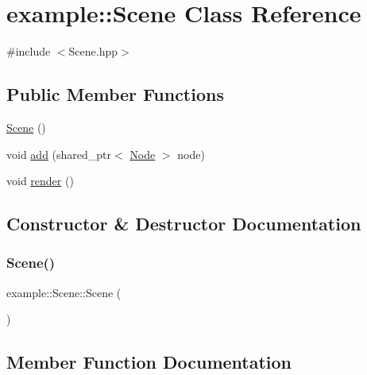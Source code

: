 \hypertarget{classexample_1_1_scene}{}\section{example\+:\+:Scene Class Reference}
\label{classexample_1_1_scene}


{\ttfamily \#include $<$Scene.\+hpp$>$}

\subsection*{Public Member Functions}
\begin{DoxyCompactItemize}
\item 
\mbox{\hyperlink{classexample_1_1_scene_a70c556631b334b52249e8c3de5dfbdb3}{Scene}} ()
\item 
void \mbox{\hyperlink{classexample_1_1_scene_ab11cb4f5a9023180eb1a9f5c9265f1ec}{add}} (shared\+\_\+ptr$<$ \mbox{\hyperlink{classexample_1_1_node}{Node}} $>$ node)
\item 
void \mbox{\hyperlink{classexample_1_1_scene_a6e8672b9fab7eaa38bc039467dc0b66a}{render}} ()
\end{DoxyCompactItemize}


\subsection{Constructor \& Destructor Documentation}
\mbox{\label{classexample_1_1_scene_a70c556631b334b52249e8c3de5dfbdb3}} 
\subsubsection{\texorpdfstring{Scene()}{Scene()}}
{\footnotesize\ttfamily example\+::\+Scene\+::\+Scene (\begin{DoxyParamCaption}{ }\end{DoxyParamCaption})\hspace{0.3cm}{\ttfamily [inline]}}



\subsection{Member Function Documentation}
\mbox{\label{classexample_1_1_scene_ab11cb4f5a9023180eb1a9f5c9265f1ec}} 
